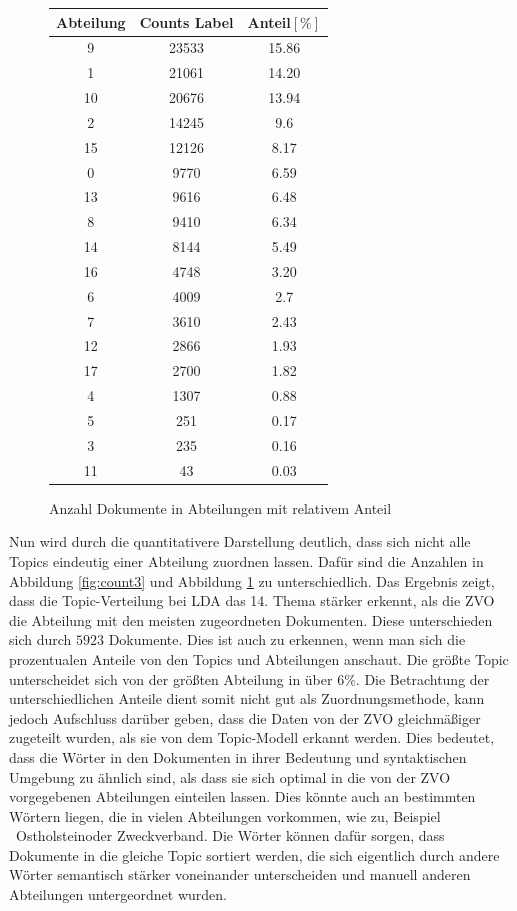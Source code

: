 \documentclass[german,version-2020-11]{uzl-thesis}
\begin{document}
\begin{figure}[H]
\begin{center}
\begin{tabular}{ccc}
\hline
\hline
Abteilung & Counts Label & Anteil$[\%]$\\
\hline
9&23533&15.86\\
1&21061&14.20\\
10&20676&13.94\\
2&14245&9.6\\
15&12126&8.17\\
0&9770&6.59\\
13&9616&6.48\\
8&9410&6.34\\
14&8144&5.49\\
16&4748&3.20\\
6&4009&2.7\\
7&3610&2.43\\
12&2866&1.93\\
17&2700&1.82\\
4&1307&0.88\\
5&251& 0.17\\
3&235&0.16\\
11&43&0.03\\
\hline
\hline
\end{tabular}
\caption{Anzahl Dokumente in Abteilungen mit relativem Anteil}
\label{fig:count4}
\end{center}
\end{figure}


Nun wird durch die quantitativere Darstellung deutlich, dass sich nicht alle Topics eindeutig einer Abteilung zuordnen lassen. Dafür sind die Anzahlen in Abbildung \ref{fig:count3} und Abbildung \ref{fig:count4} zu unterschiedlich. Das Ergebnis zeigt, dass die Topic-Verteilung bei LDA das 14. Thema stärker erkennt, als die ZVO die Abteilung mit den meisten zugeordneten Dokumenten. Diese unterschieden sich durch $5923$ Dokumente. Dies ist auch zu erkennen, wenn man sich die prozentualen Anteile von den Topics und Abteilungen anschaut. Die größte Topic unterscheidet sich von der größten Abteilung in über $6\%$. Die Betrachtung der unterschiedlichen Anteile dient somit nicht gut als Zuordnungsmethode, kann jedoch Aufschluss darüber geben, dass die Daten von der ZVO gleichmäßiger zugeteilt wurden, als sie von dem Topic-Modell erkannt werden. Dies bedeutet, dass die Wörter in den Dokumenten in ihrer Bedeutung und syntaktischen Umgebung zu ähnlich sind, als dass sie sich optimal in die von der ZVO vorgegebenen Abteilungen einteilen lassen. Dies könnte auch an bestimmten Wörtern liegen, die in vielen Abteilungen vorkommen, wie zu, Beispiel \glqq Ostholstein\grqq oder \glqq Zweckverband\grqq. Die Wörter können dafür sorgen, dass Dokumente in die gleiche Topic sortiert werden, die sich eigentlich durch andere Wörter semantisch stärker voneinander unterscheiden und manuell anderen Abteilungen untergeordnet wurden.\\ 
\end{document}
